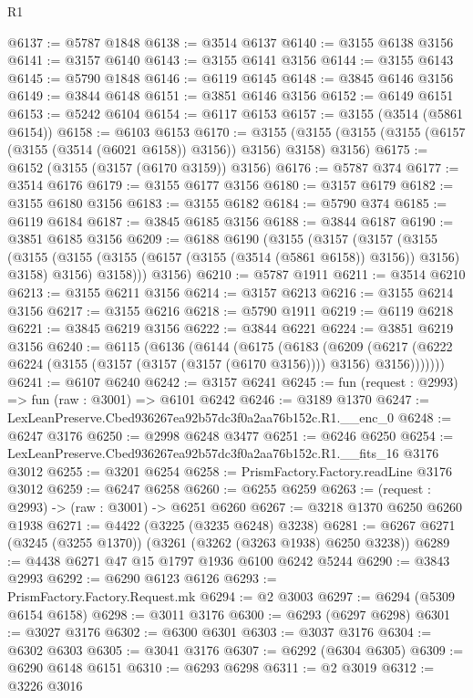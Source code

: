 \begin{lexlean}{R1}
\begin{coremodule}
@6137 := @5787 @1848
@6138 := @3514 @6137
@6140 := @3155 @6138 @3156
@6141 := @3157 @6140
@6143 := @3155 @6141 @3156
@6144 := @3155 @6143
@6145 := @5790 @1848
@6146 := @6119 @6145
@6148 := @3845 @6146 @3156
@6149 := @3844 @6148
@6151 := @3851 @6146 @3156
@6152 := @6149 @6151
@6153 := @5242 @6104
@6154 := @6117 @6153
@6157 := @3155 (@3514 (@5861 @6154))
@6158 := @6103 @6153
@6170 := @3155 (@3155 (@3155 (@3155 (@6157 (@3155 (@3514 (@6021 @6158)) @3156)) @3156) @3158) @3156)
@6175 := @6152 (@3155 (@3157 (@6170 @3159)) @3156)
@6176 := @5787 @374
@6177 := @3514 @6176
@6179 := @3155 @6177 @3156
@6180 := @3157 @6179
@6182 := @3155 @6180 @3156
@6183 := @3155 @6182
@6184 := @5790 @374
@6185 := @6119 @6184
@6187 := @3845 @6185 @3156
@6188 := @3844 @6187
@6190 := @3851 @6185 @3156
@6209 := @6188
    @6190
    (@3155
      (@3157
        (@3157
          (@3155
            (@3155 (@3155 (@3155 (@6157 (@3155 (@3514 (@5861 @6158)) @3156)) @3156) @3158) @3156)
            @3158)))
      @3156)
@6210 := @5787 @1911
@6211 := @3514 @6210
@6213 := @3155 @6211 @3156
@6214 := @3157 @6213
@6216 := @3155 @6214 @3156
@6217 := @3155 @6216
@6218 := @5790 @1911
@6219 := @6119 @6218
@6221 := @3845 @6219 @3156
@6222 := @3844 @6221
@6224 := @3851 @6219 @3156
@6240 := @6115
    (@6136
      (@6144
        (@6175
          (@6183
            (@6209
              (@6217 (@6222 @6224 (@3155 (@3157 (@3157 (@3157 (@6170 @3156)))) @3156) @3156)))))))
@6241 := @6107 @6240
@6242 := @3157 @6241
@6245 := fun (request : @2993) => fun (raw : @3001) => @6101 @6242
@6246 := @3189 @1370
@6247 := LexLeanPreserve.Cbed936267ea92b57dc3f0a2aa76b152c.R1.__enc_0
@6248 := @6247 @3176
@6250 := @2998 @6248 @3477
@6251 := @6246 @6250
@6254 := LexLeanPreserve.Cbed936267ea92b57dc3f0a2aa76b152c.R1.__fits_16 @3176 @3012
@6255 := @3201 @6254
@6258 := PrismFactory.Factory.readLine @3176 @3012
@6259 := @6247 @6258
@6260 := @6255 @6259
@6263 := (request : @2993) -> (raw : @3001) -> @6251 @6260
@6267 := @3218 @1370 @6250 @6260 @1938
@6271 := @4422 (@3225 (@3235 @6248) @3238)
@6281 := @6267 @6271 (@3245 (@3255 @1370)) (@3261 (@3262 (@3263 @1938) @6250 @3238))
@6289 := @4438 @6271 @47 @15 @1797 @1936 @6100 @6242 @5244
@6290 := @3843 @2993
@6292 := @6290 @6123 @6126
@6293 := PrismFactory.Factory.Request.mk
@6294 := @2 @3003
@6297 := @6294 (@5309 @6154 @6158)
@6298 := @3011 @3176
@6300 := @6293 (@6297 @6298)
@6301 := @3027 @3176
@6302 := @6300 @6301
@6303 := @3037 @3176
@6304 := @6302 @6303
@6305 := @3041 @3176
@6307 := @6292 (@6304 @6305)
@6309 := @6290 @6148 @6151
@6310 := @6293 @6298
@6311 := @2 @3019
@6312 := @3226 @3016

\end{coremodule}
\end{lexlean}
